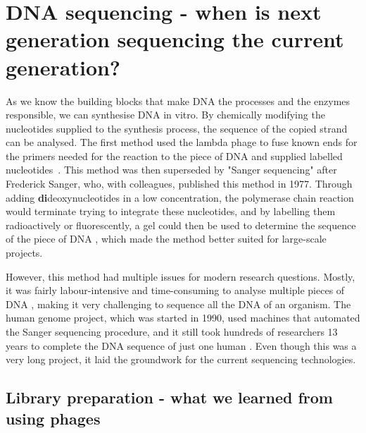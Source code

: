 \section[DNA sequencing]{DNA sequencing - when is next generation sequencing the current generation?}
\label{intro-sec:sequencing}

As we know the building blocks that make DNA  the processes and the enzymes responsible, we can synthesise DNA in vitro. By chemically modifying the nucleotides supplied to the synthesis process, the sequence of the copied strand can be analysed. The first method used the lambda phage to fuse known ends for the primers needed for the reaction to the piece of DNA and supplied labelled nucleotides~\cite{Padmanabhan1974}. This method was then superseded by "Sanger sequencing" after Frederick Sanger, who, with colleagues, published this method in 1977. Through adding \textbf{di}deoxynucleotides in a low concentration, the polymerase chain reaction would terminate trying to integrate these nucleotides, and by labelling them radioactively or fluorescently, a gel could then be used to determine the sequence of the piece of DNA \cite{Sanger1975,Sanger1977}, which made the method better suited for large-scale projects.

However, this method had multiple issues for modern research questions. Mostly, it was fairly labour-intensive and time-consuming to analyse multiple pieces of DNA , making it very challenging to sequence all the DNA of an organism. The human genome project, which was started in 1990, used machines that automated the Sanger sequencing procedure, and it still took hundreds of researchers 13 years to complete the DNA sequence of just one human \cite{Lander2001,Venter2001}. Even though this was a very long project, it laid the groundwork for  the current sequencing technologies.

\subsection[Library preparation]{Library preparation - what we learned from using phages}
\label{intro-sec:libraryprep}


